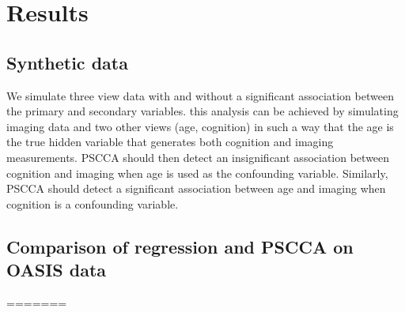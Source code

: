 \documentclass{llncs}
\begin{document}
\section{Results}
\subsection{Synthetic data}
We simulate three view data with and without a significant association
between the primary and secondary variables.  this analysis can be
achieved by simulating imaging data and two other views (age,
cognition) in such a way that the age is the true hidden variable that
generates both cognition and imaging measurements.  PSCCA should then
detect an insignificant association between cognition and imaging when
age is used as the confounding variable.  Similarly, PSCCA should
detect a significant association between age and imaging when
cognition is a confounding variable.   


\subsection{Comparison of regression and PSCCA on OASIS data}
=======
\end{document}
